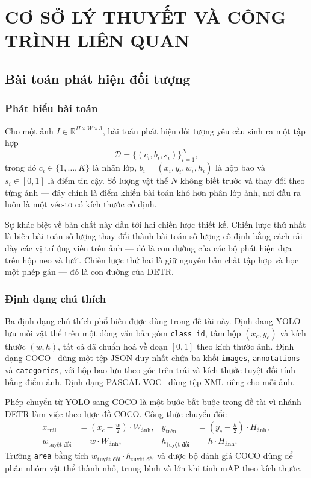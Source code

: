 \chapter{CƠ SỞ LÝ THUYẾT VÀ CÔNG TRÌNH LIÊN QUAN}
\label{ch:co_so}

\section{Bài toán phát hiện đối tượng}

\subsection{Phát biểu bài toán}

Cho một ảnh $I \in \mathbb{R}^{H \times W \times 3}$, bài toán phát hiện đối tượng yêu cầu sinh ra
một tập hợp
\begin{equation}
\label{eq:phatbieu}
\mathcal{D} = \{(c_i, b_i, s_i)\}_{i=1}^{N},
\end{equation}
trong đó $c_i \in \{1,\dots,K\}$ là nhãn lớp, $b_i = (x_i, y_i, w_i, h_i)$ là hộp bao và
$s_i \in [0,1]$ là điểm tin cậy. Số lượng vật thể $N$ không biết trước và thay đổi theo từng ảnh
--- đây chính là điểm khiến bài toán khó hơn phân lớp ảnh, nơi đầu ra luôn là một véc-tơ có kích
thước cố định.

Sự khác biệt về bản chất này dẫn tới hai chiến lược thiết kế. Chiến lược thứ nhất là biến bài toán
số lượng thay đổi thành bài toán số lượng cố định bằng cách rải dày các vị trí ứng viên trên ảnh
--- đó là con đường của các bộ phát hiện dựa trên hộp neo và lưới. Chiến lược thứ hai là giữ
nguyên bản chất tập hợp và học một phép gán --- đó là con đường của DETR.

\subsection{Định dạng chú thích}

Ba định dạng chú thích phổ biến được dùng trong đề tài này. Định dạng YOLO lưu mỗi vật thể trên
một dòng văn bản gồm \texttt{class\_id}, tâm hộp $(x_c, y_c)$ và kích thước $(w, h)$, tất cả đã
chuẩn hoá về đoạn $[0,1]$ theo kích thước ảnh. Định dạng COCO~\cite{lin2014coco} dùng một tệp JSON
duy nhất chứa ba khối \texttt{images}, \texttt{annotations} và \texttt{categories}, với hộp bao
lưu theo góc trên trái và kích thước tuyệt đối tính bằng điểm ảnh. Định dạng PASCAL
VOC~\cite{everingham2010pascalvoc} dùng tệp XML riêng cho mỗi ảnh.

Phép chuyển từ YOLO sang COCO là một bước bắt buộc trong đề tài vì nhánh DETR làm việc theo lược
đồ COCO. Công thức chuyển đổi:
\begin{align}
\label{eq:yolo2coco}
x_{\text{trái}} &= \left(x_c - \tfrac{w}{2}\right) \cdot W_{\text{ảnh}}, &
y_{\text{trên}} &= \left(y_c - \tfrac{h}{2}\right) \cdot H_{\text{ảnh}}, \\
w_{\text{tuyệt đối}} &= w \cdot W_{\text{ảnh}}, &
h_{\text{tuyệt đối}} &= h \cdot H_{\text{ảnh}}. \nonumber
\end{align}
Trường \texttt{area} bằng tích $w_{\text{tuyệt đối}} \cdot h_{\text{tuyệt đối}}$ và được bộ đánh
giá COCO dùng để phân nhóm vật thể thành nhỏ, trung bình và lớn khi tính mAP theo kích thước.

